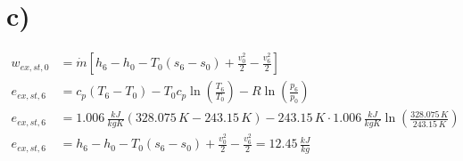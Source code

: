 

\section*{c)}

\begin{align*}
w_{ex,st,0} &= \dot{m} \left[ h_6 - h_0 - T_0 (s_6 - s_0) + \frac{v_0^2}{2} - \frac{v_6^2}{2} \right] \\
e_{ex,st,6} &= c_p (T_6 - T_0) - T_0 c_p \ln \left(\frac{T_6}{T_0}\right) - R \ln \left(\frac{p_6}{p_0}\right) \\
e_{ex,st,6} &= 1.006\,\frac{kJ}{kgK} \left( 328.075\,K - 243.15\,K \right) - 243.15\,K \cdot 1.006\,\frac{kJ}{kgK} \ln \left( \frac{328.075\,K}{243.15\,K} \right) \\
e_{ex,st,6} &= h_6 - h_0 - T_0 (s_6 - s_0) + \frac{v_0^2}{2} - \frac{v_6^2}{2} = 12.45\,\frac{kJ}{kg}
\end{align*}
